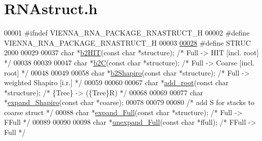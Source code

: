 \hypertarget{_r_n_astruct_8h_source}{}\section{R\+N\+Astruct.\+h}
\label{_r_n_astruct_8h_source}

\begin{DoxyCode}
00001 \textcolor{preprocessor}{#ifndef VIENNA\_RNA\_PACKAGE\_RNASTRUCT\_H}
00002 \textcolor{preprocessor}{#define VIENNA\_RNA\_PACKAGE\_RNASTRUCT\_H}
00003 
\mbox{\hyperlink{group__struct__utils_gaa100f7d3ce0ad4f527a61c5764ebf277}{00028}} \textcolor{preprocessor}{#define STRUC     2000}
00029 
00037 \textcolor{keywordtype}{char} *\mbox{\hyperlink{group__struct__utils_ga07b7e90e712559a1992fba3ac6d21bbd}{b2HIT}}(\textcolor{keyword}{const} \textcolor{keywordtype}{char} *structure);             \textcolor{comment}{/* Full   -> HIT    [incl. root] */}
00038 
00039 
00047 \textcolor{keywordtype}{char} *\mbox{\hyperlink{group__struct__utils_ga9c80d92391f2833549a8b6dac92233f0}{b2C}}(\textcolor{keyword}{const} \textcolor{keywordtype}{char} *structure);               \textcolor{comment}{/* Full   -> Coarse [incl. root] */}
00048 
00049 
00058 \textcolor{keywordtype}{char} *\mbox{\hyperlink{group__struct__utils_ga5cd2feb367feeacad0c03cb7ddba5f10}{b2Shapiro}}(\textcolor{keyword}{const} \textcolor{keywordtype}{char} *structure);         \textcolor{comment}{/* Full -> weighted Shapiro [i.r.] */}
00059 
00060 
00067 \textcolor{keywordtype}{char} *\mbox{\hyperlink{group__struct__utils_ga880d33066dd95441e5fbb73c57ed1c3e}{add\_root}}(\textcolor{keyword}{const} \textcolor{keywordtype}{char} *structure);                   \textcolor{comment}{/* \{Tree\} -> (\{Tree\}R)          */}
00068 
00069 
00077 \textcolor{keywordtype}{char} *\mbox{\hyperlink{group__struct__utils_gabe3d815b420dc4553bfb23511198b4c6}{expand\_Shapiro}}(\textcolor{keyword}{const} \textcolor{keywordtype}{char} *coarse);
00078 
00079 
00080 \textcolor{comment}{/* add S for stacks to coarse struct */}
00088 \textcolor{keywordtype}{char} *\mbox{\hyperlink{group__struct__utils_ga78d73cd54a068ef2812812771cdddc6f}{expand\_Full}}(\textcolor{keyword}{const} \textcolor{keywordtype}{char} *structure);       \textcolor{comment}{/* Full   -> FFull         */}
00089 
00090 
00098 \textcolor{keywordtype}{char} *\mbox{\hyperlink{group__struct__utils_ga260c4b622093b76a883bf96628280de1}{unexpand\_Full}}(\textcolor{keyword}{const} \textcolor{keywordtype}{char} *ffull);         \textcolor{comment}{/* FFull  -> Full          */}

\end{DoxyCode}
